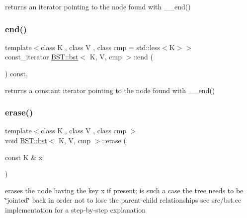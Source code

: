 returns an iterator pointing to the node found with \+\_\+\+\_\+end() \mbox{\label{classBST_1_1bst_acd7c23bcd5cf4f947ce2c0ac88fe646b}} 
\subsubsection{\texorpdfstring{end()}{end()}\hspace{0.1cm}{\footnotesize\ttfamily [2/2]}}
{\footnotesize\ttfamily template$<$class K , class V , class cmp  = std\+::less$<$\+K$>$$>$ \\
const\+\_\+iterator \hyperlink{classBST_1_1bst}{B\+S\+T\+::bst}$<$ K, V, cmp $>$\+::end (\begin{DoxyParamCaption}{ }\end{DoxyParamCaption}) const\hspace{0.3cm}{\ttfamily [inline]}, {\ttfamily [noexcept]}}

returns a constant iterator pointing to the node found with \+\_\+\+\_\+end() \mbox{\label{classBST_1_1bst_a6cd8cd1e40106c21145ae0949159bd34}} 
\subsubsection{\texorpdfstring{erase()}{erase()}}
{\footnotesize\ttfamily template$<$class K , class V , class cmp $>$ \\
void \hyperlink{classBST_1_1bst}{B\+S\+T\+::bst}$<$ K, V, cmp $>$\+::erase (\begin{DoxyParamCaption}\item[{const K \&}]{x }\end{DoxyParamCaption})}

erases the node having the key x if present; is such a case the tree needs to be \char`\"{}jointed\char`\"{} back in order not to lose the parent-\/child relationships see src/bst.\+cc implementation for a step-\/by-\/step explanation \mbox{\label{classBST_1_1bst_a35880bb25ce5fbe2a10ce004b33cd5f2}} 
